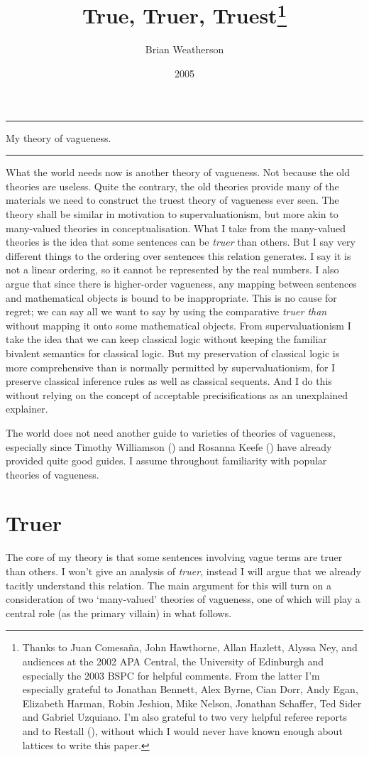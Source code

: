 \documentclass[
  10pt,
  letterpaper,
  DIV=11,
  numbers=noendperiod,
  twoside]{scrartcl}
\title{True, Truer, Truest\thanks{Thanks to Juan Comesaña, John
Hawthorne, Allan Hazlett, Alyssa Ney, and audiences at the 2002 APA
Central, the University of Edinburgh and especially the 2003 BSPC for
helpful comments. From the latter I'm especially grateful to Jonathan
Bennett, Alex Byrne, Cian Dorr, Andy Egan, Elizabeth Harman, Robin
Jeshion, Mike Nelson, Jonathan Schaffer, Ted Sider and Gabriel Uzquiano.
I'm also grateful to two very helpful referee reports and to Restall
(\citeproc{ref-Restall2000}{1999}), without which I would never have
known enough about lattices to write this paper.}}
\author{Brian Weatherson}
\date{2005}
\renewenvironment{abstract}
 {\vspace{-1.25cm}
 \quotation\small\noindent\rule{\linewidth}{.5pt}\par\smallskip
 \noindent }
 {\par\noindent\rule{\linewidth}{.5pt}\endquotation}
\begin{document}
\maketitle
\begin{abstract}
My theory of vagueness.
\end{abstract}

What the world needs now is another theory of vagueness. Not because the
old theories are useless. Quite the contrary, the old theories provide
many of the materials we need to construct the truest theory of
vagueness ever seen. The theory shall be similar in motivation to
supervaluationism, but more akin to many-valued theories in
conceptualisation. What I take from the many-valued theories is the idea
that some sentences can be \emph{truer} than others. But I say very
different things to the ordering over sentences this relation generates.
I say it is not a linear ordering, so it cannot be represented by the
real numbers. I also argue that since there is higher-order vagueness,
any mapping between sentences and mathematical objects is bound to be
inappropriate. This is no cause for regret; we can say all we want to
say by using the comparative \emph{truer than} without mapping it onto
some mathematical objects. From supervaluationism I take the idea that
we can keep classical logic without keeping the familiar bivalent
semantics for classical logic. But my preservation of classical logic is
more comprehensive than is normally permitted by supervaluationism, for
I preserve classical inference rules as well as classical sequents. And
I do this without relying on the concept of acceptable precisifications
as an unexplained explainer.

The world does not need another guide to varieties of theories of
vagueness, especially since Timothy Williamson
() and Rosanna Keefe
() have already provided quite good
guides. I assume throughout familiarity with popular theories of
vagueness.

\section{Truer}\label{truer}

The core of my theory is that some sentences involving vague terms are
truer than others. I won't give an analysis of \emph{truer}, instead I
will argue that we already tacitly understand this relation. The main
argument for this will turn on a consideration of two `many-valued'
theories of vagueness, one of which will play a central role (as the
primary villain) in what follows.
\end{document}
